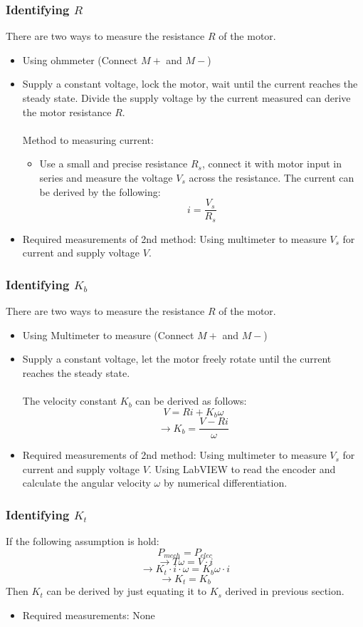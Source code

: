 \documentclass{article}
\begin{document}
\subsubsection{Identifying $R$}
There are two ways to measure the resistance $R$ of the motor.
\begin{itemize}
\item Using ohmmeter (Connect $M+$ and $M-$)
\item Supply a constant voltage, lock the motor, wait until the current reaches the steady state. Divide the supply voltage by the current measured can derive the motor resistance $R$.\\ \\
Method to measuring current:
    \begin{itemize}
    \item Use a small and precise resistance $R_s$, connect it with motor input in series and measure     the voltage $V_s$ across the resistance. The current can be derived by the following:
    \[i=\frac{V_s}{R_s}\]
    \end{itemize}
\item Required measurements of 2nd method: Using multimeter to measure $V_s$ for current and supply voltage $V$.
\end{itemize}

\subsubsection{Identifying $K_b$}
There are two ways to measure the resistance $R$ of the motor.
\begin{itemize}
\item Using Multimeter to measure (Connect $M+$ and $M-$)
\item Supply a constant voltage, let the motor freely rotate until the current reaches the steady state.\\ \\
The velocity constant $K_b$ can be derived as follows:
    \[V=Ri+K_b\omega\]
    \[\rightarrow K_b=\frac{V-Ri}{\omega}\]
\item Required measurements of 2nd method: Using multimeter to measure $V_s$ for current and supply voltage $V$. Using LabVIEW to read the encoder and calculate the angular velocity $\omega$ by numerical differentiation.    
\end{itemize}

\subsubsection{Identifying $K_t$}
If the following assumption  is hold:
\[P_{mech}=P_{elec}\]
\[\rightarrow T\omega=V\cdot i\]
\[\rightarrow K_t\cdot i\cdot \omega=K_b\omega \cdot i\]
\[\rightarrow K_t=K_b\]
Then $K_t$ can be derived by just equating it to $K_s$ derived in previous section.
\begin{itemize}
\item Required measurements: None
\end{itemize}
\end{document}
